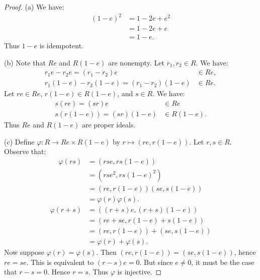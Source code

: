 \documentclass[11pt,twoside,openany]{memoir}
\begin{document}
    {\color{blue} \begin{proof}
        (a) We have:
            \begin{equation*}
            \begin{split}
                (1-e)^2 
                & = 1-2e + e^2 \\
                & = 1-2e + e \\
                & = 1-e.
            \end{split}
            \end{equation*}
        Thus $1-e$ is idempotent.

        (b) Note that $Re$ and $R(1-e)$ are nonempty. Let $r_1,r_2 \in R$. We have:
            \begin{equation*}
            \begin{split}
                r_1e - r_2e = (r_1 - r_2)e &\in Re, \\
                r_1(1-e) - r_2 (1-e) = (r_1 - r_2)(1-e) &\in Re.
            \end{split}
            \end{equation*}
        Let $re \in Re$, $r(1-e) \in R(1-e)$, and $s \in R$. We have:
            \begin{equation*}
            \begin{split}
                s(re) = (sr)e &\in Re \\
                s(r(1-e)) = (sr)(1-e) &\in R(1-e).
            \end{split}
            \end{equation*}
        Thus $Re$ and $R(1-e)$ are proper ideals.

        (c) Define $\varphi:R \rightarrow Re \times R(1-e)$ by $r \mapsto (re, r(1-e))$. Let $r,s \in R$. Observe that:
            \begin{equation*}
            \begin{split}
                \varphi(rs) 
                & = (rse,rs(1-e)) \\
                & = (rse^2,rs(1-e)^2)\\
                & = (re,r(1-e))(se,s(1-e))\\
                & = \varphi(r)\varphi(s).
            \end{split}
            \end{equation*}
            \begin{equation*}
            \begin{split}
                \varphi(r+s)
                & = ((r+s)e,(r+s)(1-e)) \\
                & = (re +se, r(1-e) + s(1-e)) \\
                & = (re,r(1-e)) + (se,s(1-e)) \\
                & = \varphi(r) + \varphi(s).
            \end{split}
            \end{equation*}
        Now suppose $\varphi(r) = \varphi(s)$. Then $(re,r(1-e)) = (se,s(1-e))$, hence $re = se$. This is equivalent to $(r-s)e = 0$. But since $e \neq 0$, it must be the case that $r-s = 0$. Hence $r=s$. Thus $\varphi$ is injective.


\end{proof}}
\end{document}
